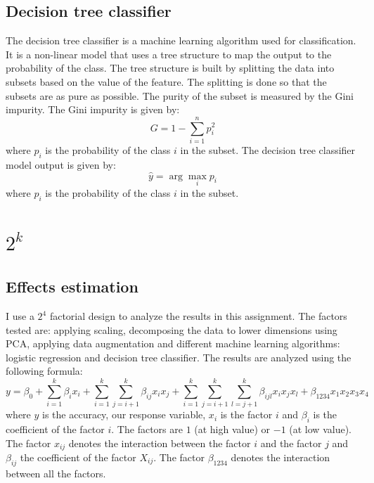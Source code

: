 \documentclass{article}
\begin{document}
\subsection{Decision tree classifier}
\label{subsec:decision_tree}
The decision tree classifier is a machine learning algorithm used for classification. It is a non-linear model that uses a tree structure to map the output to the probability of the class. The tree structure is built by splitting the data into subsets based on the value of the feature. The splitting is done so that the subsets are as pure as possible. The purity of the subset is measured by the Gini impurity. The Gini impurity is given by:
\begin{equation}
    G = 1 - \sum_{i=1}^{n} p_i^2
\end{equation}
where $p_i$ is the probability of the class $i$ in the subset. The decision tree classifier model output is given by:
\begin{equation}
    \hat{y} = \arg\max_{i} p_i
\end{equation}
where $p_i$ is the probability of the class $i$ in the subset.

\section{\texorpdfstring{$2^k$} }
\label{sec:factorial_design}

\subsection{Effects estimation}
I use a $2^4$ factorial design to analyze the results in this assignment. The factors tested are: applying scaling, decomposing the data to lower dimensions using PCA, applying data augmentation and different machine learning algorithms: logistic regression and decision tree classifier. The results are analyzed using the following formula:
\begin{equation}
    y = \beta_0 + \sum_{i=1}^{k} \beta_i x_i + \sum_{i=1}^{k} \sum_{j=i+1}^{k} \beta_{ij} x_i x_j + \sum_{i=1}^{k} \sum_{j=i+1}^{k} \sum_{l=j+1}^{k} \beta_{ijl} x_i x_j x_l + \beta_{1234} x_1 x_2 x_3 x_4
\end{equation}
where $y$ is the accuracy, our response variable, $x_i$ is the factor $i$ and $\beta_i$ is the coefficient of the factor $i$. The factors are $1$ (at high value) or $-1$ (at low value). The factor $x_{ij}$ denotes the interaction between the factor $i$ and the factor $j$ and $\beta_{ij}$ the coefficient of the factor $X_{ij}$. The factor $\beta_{1234}$ denotes the interaction between all the factors.
\end{document}
